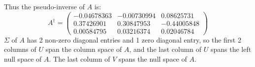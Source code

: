 \documentclass[conference,onecolumn]{IEEEtran}
\begin{document}
\begin{enumerate}[label=\arabic{enumi}.]
\begin{enumerate}
                    Thus the pseudo-inverse of $A$ is:
                    $$
                        A^{\dagger} =
                        \begin{pmatrix}
                            -0.04678363 & -0.00730994 & 0.08625731  \\
                            0.37426901  & 0.30847953  & -0.44005848 \\
                            0.00584795  & 0.03216374  & 0.02046784
                        \end{pmatrix}
                    $$
                    $\Sigma$ of $A$ has 2 non-zero diagonal entries and 1 zero diagonal entry, so the first 2 columns of $U$ span the column space of $A$, and the last column of $U$ spans the left null space of $A$.
                    The last column of $V$ spans the null space of $A$.


\end{enumerate}
\end{enumerate}
\end{document}
